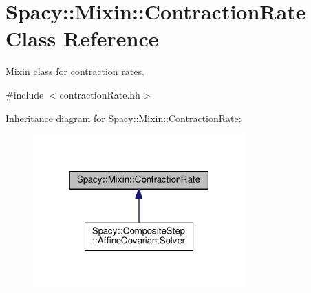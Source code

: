 \hypertarget{classSpacy_1_1Mixin_1_1ContractionRate}{}\section{Spacy\+:\+:Mixin\+:\+:Contraction\+Rate Class Reference}
\label{classSpacy_1_1Mixin_1_1ContractionRate}


Mixin class for contraction rates.  




{\ttfamily \#include $<$contraction\+Rate.\+hh$>$}



Inheritance diagram for Spacy\+:\+:Mixin\+:\+:Contraction\+Rate\+:\nopagebreak
\begin{figure}[H]
\begin{center}
\leavevmode
\includegraphics[width=231pt]{classSpacy_1_1Mixin_1_1ContractionRate__inherit__graph}
\end{center}
\end{figure}
